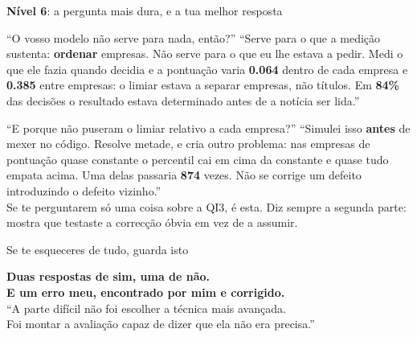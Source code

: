 \documentclass[aspectratio=169]{beamer}
\newcommand{\key}[1]{\textbf{\textcolor{blue!55!black}{#1}}}
\begin{document}
\begin{frame}{\key{Nível 6}: a pergunta mais dura, e a tua melhor resposta}
\small
\begin{block}{``O vosso modelo não serve para nada, então?''}
``Serve para o que a medição sustenta: \textbf{ordenar} empresas. Não serve para o que eu lhe
estava a pedir. Medi o que ele fazia quando decidia e a pontuação varia \key{0.064} dentro de cada
empresa e \key{0.385} entre empresas: o limiar estava a separar empresas, não títulos. Em
\key{84\%} das decisões o resultado estava determinado antes de a notícia ser lida.''
\end{block}
\begin{block}{``E porque não puseram o limiar relativo a cada empresa?''}
``Simulei isso \textbf{antes} de mexer no código. Resolve metade, e cria outro problema: nas
empresas de pontuação quase constante o percentil cai em cima da constante e quase tudo empata
acima. Uma delas passaria \key{874} vezes. Não se corrige um defeito introduzindo o defeito
vizinho.''\\
\footnotesize \textcolor{red!60!black}{Se te perguntarem só uma coisa sobre a QI3, é esta. Diz
sempre a segunda parte: mostra que testaste a correcção óbvia em vez de a assumir.}
\end{block}
\end{frame}

\begin{frame}{Se te esqueceres de tudo, guarda isto}
\begin{center}
\vspace{3mm}
\large
\key{Duas respostas de sim, uma de não.}\\[4mm]
\key{E um erro meu, encontrado por mim e corrigido.}\\[8mm]
\normalsize
``A parte difícil não foi escolher a técnica mais avançada.\\
Foi montar a avaliação capaz de dizer que ela não era precisa.''
\end{center}
\end{frame}
\end{document}

